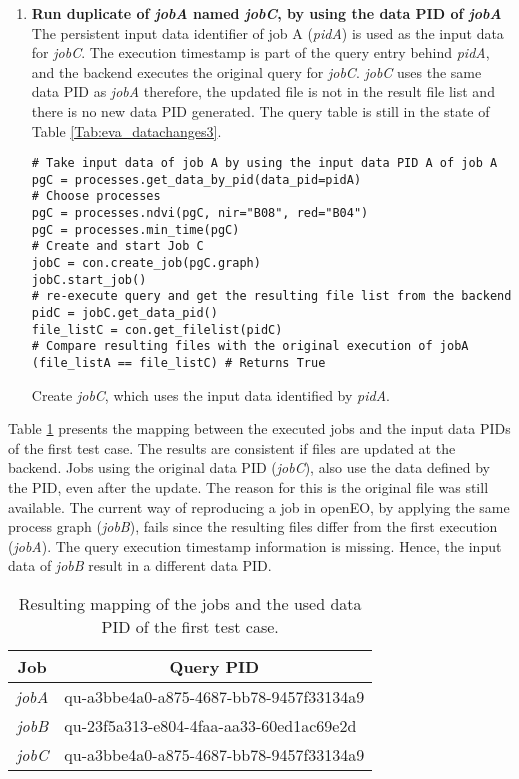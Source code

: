 \documentclass[draft,final]{vutinfth} %
\newenvironment{code}{\captionsetup{type=listing}}{}
\begin{document}
\begin{enumerate}
	\item \textbf{Run duplicate of \textit{jobA} named \textit{jobC}, by using the data PID of \textit{jobA} }\\
	The persistent input data identifier of job A (\textit{pidA}) is used as the input data for \textit{jobC}. The execution timestamp is part of the query entry behind \textit{pidA}, and the backend executes the original query for \textit{jobC}. \textit{jobC} uses the same data PID as \textit{jobA} therefore, the updated file is not in the result file list and there is no new data PID generated. The query table is still in the state of Table \ref{Tab:eva_datachanges3}. 
	\begin{code}
		\begin{verbatim}
# Take input data of job A by using the input data PID A of job A
pgC = processes.get_data_by_pid(data_pid=pidA)
# Choose processes
pgC = processes.ndvi(pgC, nir="B08", red="B04")
pgC = processes.min_time(pgC)
# Create and start Job C
jobC = con.create_job(pgC.graph)
jobC.start_job()
# re-execute query and get the resulting file list from the backend
pidC = jobC.get_data_pid()
file_listC = con.get_filelist(pidC)
# Compare resulting files with the original execution of jobA
(file_listA == file_listC) # Returns True
		\end{verbatim}
		\caption{Create \textit{jobC}, which uses the input data identified by \textit{pidA}.}
		\label{lst:eva_datachange_5}
	\end{code}
\end{enumerate}

Table \ref{Tab:eva_datachanges4} presents the mapping between the executed jobs and the input data PIDs of the first test case. The results are consistent if files are updated at the backend. Jobs using the original data PID (\textit{jobC}), also use the data defined by the PID, even after the update. The reason for this is the original file was still available. The current way of reproducing a job in openEO, by applying the same process graph (\textit{jobB}), fails since the resulting files differ from the first execution (\textit{jobA}). The query execution timestamp information is missing. Hence, the input data of \textit{jobB} result in a different data PID.       

\begin{table}[]
	\caption{Resulting mapping of the jobs and the used data PID of the first test case.}
	\centering
	\begin{tabular}{|r|l|}
		\hline \multicolumn{1}{|c|}{\textbf{Job}}  &  \multicolumn{1}{c|}{\textbf{Query PID}} \\ \hline
		\textit{jobA} & qu-a3bbe4a0-a875-4687-bb78-9457f33134a9  \\ 
		\textit{jobB} & qu-23f5a313-e804-4faa-aa33-60ed1ac69e2d \\
		\textit{jobC} & qu-a3bbe4a0-a875-4687-bb78-9457f33134a9  \\ \hline
	\end{tabular}
	\label{Tab:eva_datachanges4}
\end{table}
\newpage
\end{document}
